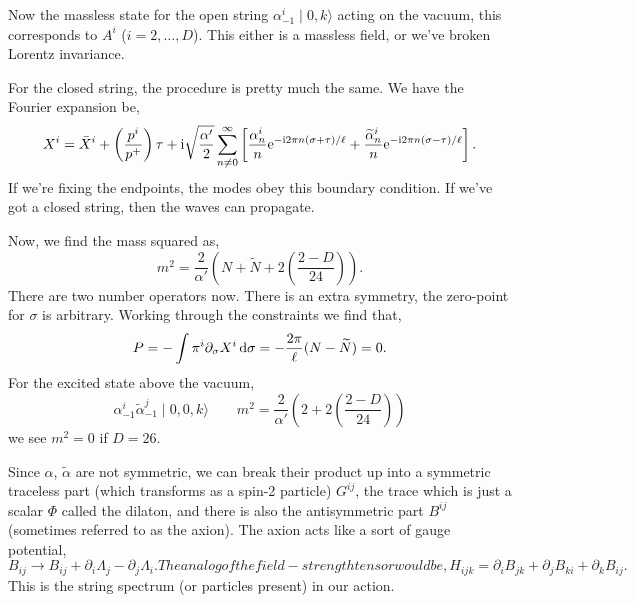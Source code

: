 \lecture

Now the massless state for the open string
$\alpha^{i}_{-1}\mid0,k\rangle$ acting on the vacuum, this corresponds
to $A^{i}$ ($i=2,\dots,D$). This either is a massless field, or we've
broken Lorentz invariance.

For the closed string, the procedure is pretty much the same. We have
the Fourier expansion be,
\begin{equation}
X^{i} = \bar{X}^{i} + \left(\frac{p^{i}}{p^{+}}\right)\tau
+\mathrm{i}\sqrt{\frac{\alpha'}{2}}\sum^{\infty}_{n\neq0}\left[
\frac{\alpha^{i}_{n}}{n}\mathrm{e}^{-\mathrm{i}2\pi n(\sigma+\tau)/\ell}
+\frac{\widetilde{\alpha}^{i}_{n}}{n}\mathrm{e}^{-\mathrm{i}2\pi n(\sigma-\tau)/\ell}
  \right].
\end{equation}
If we're fixing the endpoints, the modes obey this boundary condition.
If we've got a closed string, then the waves can propagate.

Now, we find the mass squared as,
\begin{equation}
m^{2}=\frac{2}{\alpha'}\left(N+\widetilde{N}+2\left(\frac{2-D}{24}\right)\right).
\end{equation}
There are two number operators now. There is an extra symmetry, the
zero-point for $\sigma$ is arbitrary. Working through the constraints we
find that,
\begin{equation}
P = -\int\pi^{i}\partial_{\sigma}X^{i}\,\mathrm{d}\sigma = -\frac{2\pi}{\ell}(N-\widetilde{N})=0.
\end{equation}
For the excited state above the vacuum,
\begin{equation}
\alpha^{i}_{-1}\widetilde{\alpha}^{j}_{-1}\mid0,0,k\rangle\qquad m^{2}=\frac{2}{\alpha'}\left(2+2\left(\frac{2-D}{24}\right)\right)
\end{equation}
we see $m^{2}=0$ if $D=26$.

Since $\alpha$, $\widetilde{\alpha}$ are not symmetric, we can break
their product up into a symmetric traceless part (which transforms as a
spin-2 particle) $G^{ij}$, the trace which is just a scalar $\Phi$
called the dilaton, and there is also the antisymmetric part $B^{ij}$
(sometimes referred to as the axion). The axion acts like a sort of
gauge potential,
\begin{subequations}
\begin{equation}
B_{ij}\to B_{ij} +\partial_{i}\Lambda_{j}-\partial_{j}\Lambda_{i}.
\end{equation}
The analog of the field-strength tensor would be,
\begin{equation}
H_{ijk} = \partial_{i}B_{jk} + \partial_{j}B_{ki} + \partial_{k}B_{ij}.
\end{equation}
\end{subequations}
This is the string spectrum (or particles present) in our action.

